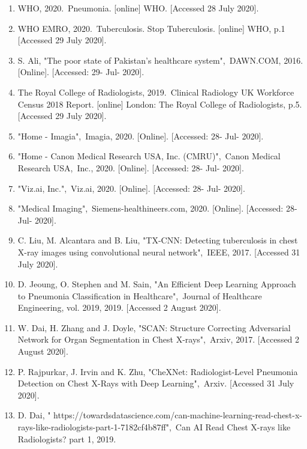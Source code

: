 \documentclass{article} %
\begin{document}
\begin{enumerate}
\item \textbf{ }WHO, 2020.~Pneumonia. [online] WHO. [Accessed 28 July 2020].

\item  WHO EMRO, 2020.~Tuberculosis. Stop Tuberculosis. [online] WHO, p.1 [Accessed 29 July 2020].

\item  S. Ali, "The poor state of Pakistan's healthcare system",~DAWN.COM, 2016. [Online]. [Accessed: 29- Jul- 2020].

\item  The Royal College of Radiologists, 2019.~Clinical Radiology UK Workforce Census 2018 Report. [online] London: The Royal College of Radiologists, p.5. [Accessed 29 July 2020].

\item  "Home - Imagia",~Imagia, 2020. [Online]. [Accessed: 28- Jul- 2020].

\item  "Home - Canon Medical Research USA, Inc. (CMRU)",~Canon Medical Research USA,~Inc., 2020. [Online]. [Accessed: 28- Jul- 2020].

\item  "Viz.ai, Inc.",~Viz.ai, 2020. [Online]. [Accessed: 28- Jul- 2020].

\item  "Medical Imaging",~Siemens-healthineers.com, 2020. [Online]. [Accessed: 28- Jul- 2020].

\item  C. Liu, M. Alcantara and B. Liu, "TX-CNN: Detecting tuberculosis in chest X-ray images using convolutional neural network",~IEEE, 2017. [Accessed 31 July 2020].

\item  D. Jeoung, O. Stephen and M. Sain, "An Efficient Deep Learning Approach to Pneumonia Classification in Healthcare",~Journal of Healthcare Engineering, vol. 2019, 2019. [Accessed 2 August 2020].

\item  W. Dai, H. Zhang and J. Doyle, "SCAN: Structure Correcting Adversarial Network for Organ Segmentation in Chest X-rays",~Arxiv, 2017. [Accessed 2 August 2020]. 

\item  P. Rajpurkar, J. Irvin and K. Zhu, "CheXNet: Radiologist-Level Pneumonia Detection on Chest X-Rays with Deep Learning",~Arxiv. [Accessed 31 July 2020].

\item  D. Dai, " https://towardsdatascience.com/can-machine-learning-read-chest-x-rays-like-radiologists-part-1-7182cf4b87ff",~Can AI Read Chest X-rays like Radiologists? part 1, 2019.


\end{enumerate}
\end{document}

